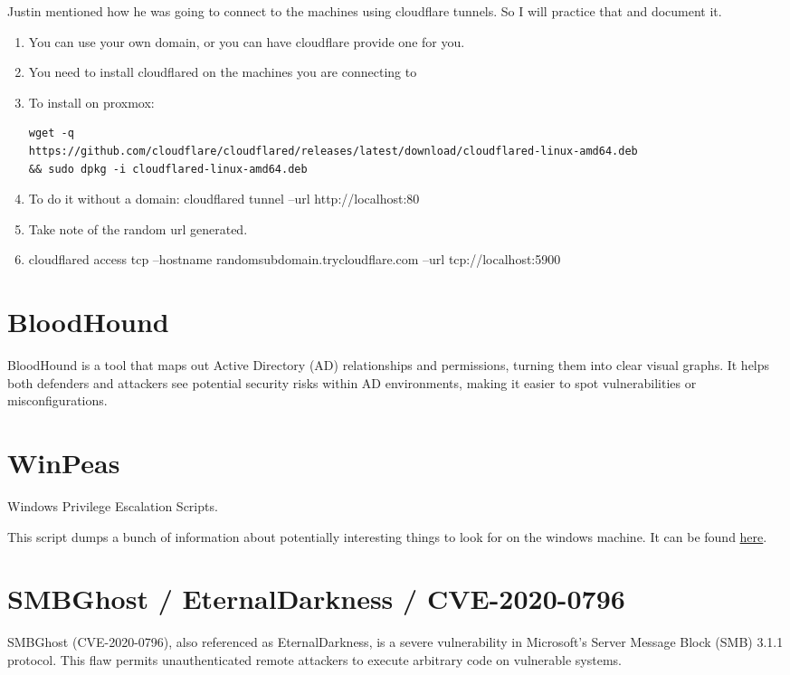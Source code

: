 \documentclass{article}
\begin{document}
Justin mentioned how he was going to connect to the machines using cloudflare tunnels. So I will practice that and document it.

\begin{enumerate}
\item You can use your own domain, or you can have cloudflare provide one for you.
\item You need to install cloudflared on the machines you are connecting to
\item To install on proxmox:
\begin{adjustwidth}{-5cm}{}
\begin{lstlisting}
wget -q 
https://github.com/cloudflare/cloudflared/releases/latest/download/cloudflared-linux-amd64.deb 
&& sudo dpkg -i cloudflared-linux-amd64.deb
\end{lstlisting}
\end{adjustwidth}
    
\item To do it without a domain: cloudflared tunnel --url http://localhost:80

\item Take note of the random url generated.

\item cloudflared access tcp --hostname randomsubdomain.trycloudflare.com --url tcp://localhost:5900
\end{enumerate}
\section{BloodHound}
BloodHound is a tool that maps out Active Directory (AD) relationships and 
permissions, turning them into clear visual graphs. It helps both defenders
and attackers see potential security risks within AD environments, making 
it easier to spot vulnerabilities or misconfigurations.

\section{WinPeas}
Windows Privilege Escalation Scripts.

This script dumps a bunch of information about potentially interesting things to look for on
the windows machine. It can be found \href{https://github.com/carlospolop/PEASS-ng/tree/master/winPEAS}{here}.
 

\section{SMBGhost / EternalDarkness / CVE-2020-0796}
SMBGhost (CVE-2020-0796), also referenced as EternalDarkness, 
is a severe vulnerability in Microsoft's Server Message Block (SMB) 
3.1.1 protocol. This flaw permits unauthenticated remote attackers to 
execute arbitrary code on vulnerable systems.
\end{document}
